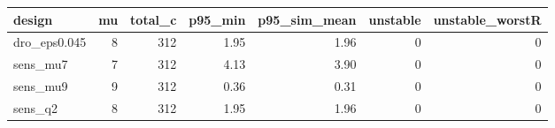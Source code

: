\begin{tabular}{lrrrrrr}
\toprule
design & mu & total\_c & p95\_min & p95\_sim\_mean & unstable & unstable\_worstR \\
\midrule
dro\_eps0.045 & 8 & 312 & 1.95 & 1.96 & 0 & 0 \\
sens\_mu7 & 7 & 312 & 4.13 & 3.90 & 0 & 0 \\
sens\_mu9 & 9 & 312 & 0.36 & 0.31 & 0 & 0 \\
sens\_q2 & 8 & 312 & 1.95 & 1.96 & 0 & 0 \\
\bottomrule
\end{tabular}
